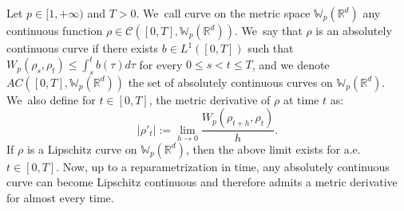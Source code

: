\documentclass[JEP,XML,SOM,Unicode, NoFloatCountersInSection,published]{cedram}
\def\RR{\mathbb{R}}
\def\WW{\mathbb{W}}
\def\calC{{\mathcal C}}
\theoremstyle{plain}
\theoremstyle{definition}
\begin{document}
Let $p \in [1,+\infty)$ and $T > 0$. We~call curve on the metric space $\WW_p(\RR^d)$ any continuous function $\rho \in \calC([0,T], \WW_p(\RR^d))$. We~say that $\rho$ is an absolutely continuous curve if there exists $b \in L^1([0,T])$ such that $W_p(\rho_s, \rho_t) \leq \int_s^t b(\tau)d\tau$ for every $0\leq s<t\leq T$, and we denote $AC([0,T], \WW_p(\RR^d))$ the set of absolutely continuous curves on $\WW_p(\RR^d)$. We~also define for $t \in [0,T]$, the metric derivative of $\rho$ at time $t$ as:
\begin{equation*}
|\rho'_t| := \lim_{h \to 0} \frac{W_p(\rho_{t+h},\rho_t)}{h}.
\end{equation*}
If $\rho$ is a Lipschitz curve on $\WW_p(\RR^d)$, then the above limit exists for a.e. $t \in [0,T]$. Now, up to a reparametrization in time, any absolutely continuous curve can become Lipschitz continuous and therefore admits a metric derivative for almost every time.
\end{document}
